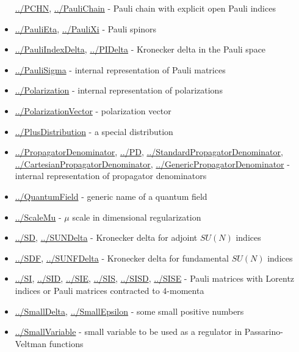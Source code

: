 \documentclass[../FeynCalcManual.tex]{subfiles}
\begin{document}
\begin{itemize}
  \hyperlink{../pchn}{../PCHN}, \hyperlink{../paulichain}{../PauliChain}
  - Pauli chain with explicit open Pauli indices
\item
  \hyperlink{../paulieta}{../PauliEta},
  \hyperlink{../paulixi}{../PauliXi} - Pauli spinors
\item
  \hyperlink{../pauliindexdelta}{../PauliIndexDelta},
  \hyperlink{../pidelta}{../PIDelta} - Kronecker delta in the Pauli
  space
\item
  \hyperlink{../paulisigma}{../PauliSigma} - internal representation of
  Pauli matrices
\item
  \hyperlink{../polarization}{../Polarization} - internal representation
  of polarizations
\item
  \hyperlink{../polarizationvector}{../PolarizationVector} -
  polarization vector
\item
  \hyperlink{../plusdistribution}{../PlusDistribution} - a special
  distribution
\item
  \hyperlink{../propagatordenominator}{../PropagatorDenominator},
  \hyperlink{../pd}{../PD},
  \hyperlink{../standardpropagatordenominator}{../StandardPropagatorDenominator},
  \hyperlink{../cartesianpropagatordenominator}{../CartesianPropagatorDenominator},
  \hyperlink{../genericpropagatordenominator}{../GenericPropagatorDenominator}
  - internal representation of propagator denominators
\item
  \hyperlink{../quantumfield}{../QuantumField} - generic name of a
  quantum field
\item
  \hyperlink{../scalemu}{../ScaleMu} - \(\mu\) scale in dimensional
  regularization
\item
  \hyperlink{../sd}{../SD}, \hyperlink{../sundelta}{../SUNDelta} -
  Kronecker delta for adjoint \(SU(N)\) indices
\item
  \hyperlink{../sdf}{../SDF}, \hyperlink{../sunfdelta}{../SUNFDelta} -
  Kronecker delta for fundamental \(SU(N)\) indices
\item
  \hyperlink{../si}{../SI}, \hyperlink{../sid}{../SID},
  \hyperlink{../sie}{../SIE}, \hyperlink{../sis}{../SIS},
  \hyperlink{../sisd}{../SISD}, \hyperlink{../sise}{../SISE} - Pauli
  matrices with Lorentz indices or Pauli matrices contracted to
  \(4\)-momenta
\item
  \hyperlink{../smalldelta}{../SmallDelta},
  \hyperlink{../smallepsilon}{../SmallEpsilon} - some small positive
  numbers
\item
  \hyperlink{../smallvariable}{../SmallVariable} - small variable to be
  used as a regulator in Passarino-Veltman functions

\end{itemize}
\end{document}
